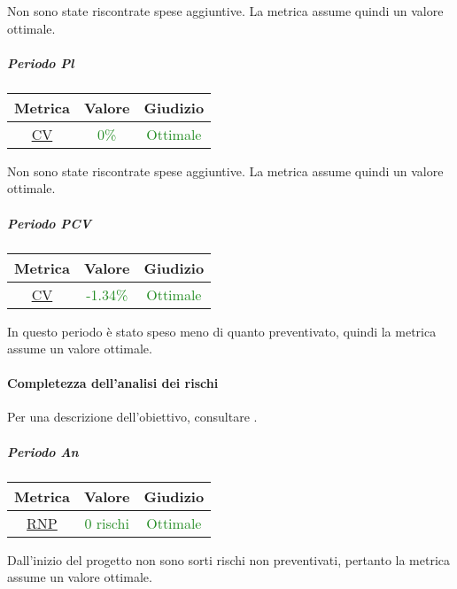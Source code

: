 					Non sono state riscontrate spese aggiuntive. La metrica assume quindi un valore ottimale.
					
				\subparagraph{Periodo Pl}
					\begin{table}[H]
						\centering
						\begin{tabular}{  c | c | c}
							\hline
							\textbf{Metrica} & \textbf{Valore} & \textbf{Giudizio} \\
							\hline
							\hyperref[MRDB]{CV}    & \textcolor{ForestGreen}{0\%}      & \textcolor{ForestGreen}{Ottimale}  \\\hline
						\end{tabular}
					\end{table}
%				
					Non sono state riscontrate spese aggiuntive. La metrica assume quindi un valore ottimale.
					
					\subparagraph{Periodo PCV}
					\begin{table}[H]
						\centering
						\begin{tabular}{  c | c | c}
							\hline
							\textbf{Metrica} & \textbf{Valore} & \textbf{Giudizio} \\
							\hline
							\hyperref[MRDB]{CV}    & \textcolor{ForestGreen}{-1.34\%}      & \textcolor{ForestGreen}{Ottimale}  \\\hline
						\end{tabular}
					\end{table}
					In questo periodo è stato speso meno di quanto preventivato, quindi la metrica assume un valore ottimale.
					\newpage
					
			\paragraph{Completezza dell'analisi dei rischi}
			\label{RCDADR}
				Per una descrizione dell'obiettivo, consultare .
			
				\subparagraph{Periodo An}
				\begin{table}[H]
					\centering
					\begin{tabular}{  c | c | c}
						\hline
						\textbf{Metrica} & \textbf{Valore} & \textbf{Giudizio} \\
						\hline
						\hyperref[MRDB]{RNP}    & \textcolor{ForestGreen}{0 rischi}      & \textcolor{ForestGreen}{Ottimale}  \\\hline
					\end{tabular}
				\end{table}
					Dall'inizio del progetto non sono sorti rischi non preventivati, pertanto la metrica assume un valore ottimale.
				
